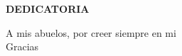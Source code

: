 \begin{center}
  {\Large  \bf{DEDICATORIA}}
\end{center}
\begin{center}
  A mis abuelos, por creer siempre en mi\\
  Gracias
\end{center}
